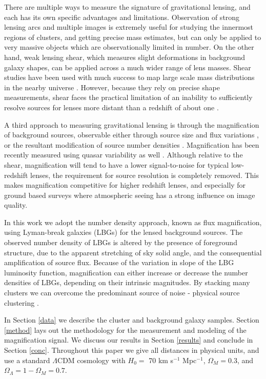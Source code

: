 There are multiple ways to measure the signature of gravitational lensing, and each has its own specific advantages and limitations. Observation of strong lensing arcs and multiple images is extremely useful for studying the innermost regions of clusters, and getting precise mass estimates, but can only be applied to very massive objects which are observationally limited in number. On the other hand, weak lensing shear, which measures slight deformations in background galaxy shapes, can be applied across a much wider range of lens masses. Shear studies have been used with much success to map large scale mass distributions in the nearby universe \citep{Waerbeke13, Massey07}. However, because they rely on precise shape measurements, shear faces the practical limitation of an inability to sufficiently resolve sources for lenses more distant than a redshift of about one \citep{LHJM10}.

A third approach to measuring gravitational lensing is through the magnification of background sources, observable either through source size and flux variations \citep{Schmidt12,Huff14}, or the resultant modification of source number densities \citep{Ford12, Morrison12, Hildebrandt13, Hildebrandt11, Hildebrandt09b, Scranton05}. Magnification has been recently measured using quasar variability as well \citep{Bauer11}. Although relative to the shear, magnification will tend to have a lower signal-to-noise for typical low-redshift lenses, the requirement for source resolution is completely removed. This makes magnification competitive for higher redshift lenses, and especially for ground based surveys where atmospheric seeing has a strong influence on image quality.

In this work we adopt the number density approach, known as flux magnification, using Lyman-break galaxies (LBGs) for the lensed background sources. The observed number density of LBGs is altered by the presence of foreground structure, due to the apparent stretching of sky solid angle, and the consequential amplification of source flux. Because of the variation in slope of the LBG luminosity function, magnification can either increase or decrease the number densities of LBGs, depending on their intrinsic magnitudes. By stacking many clusters we can overcome the predominant source of noise - physical source clustering \citep{Hildebrandt11}. 

In Section \ref{data} we describe the cluster and background galaxy samples. Section \ref{method} lays out the methodology for the measurement and modeling of the magnification signal. We discuss our results in Section \ref{results} and conclude in Section \ref{conc}. Throughout this paper we give all distances in physical units, and use a standard $\Lambda$CDM cosmology with $H_0 =$ 70 km s$^{-1}$ Mpc$^{-1}$, $\Omega_M = 0.3$, and $\Omega_{\Lambda} = 1 - \Omega_M = 0.7$.


